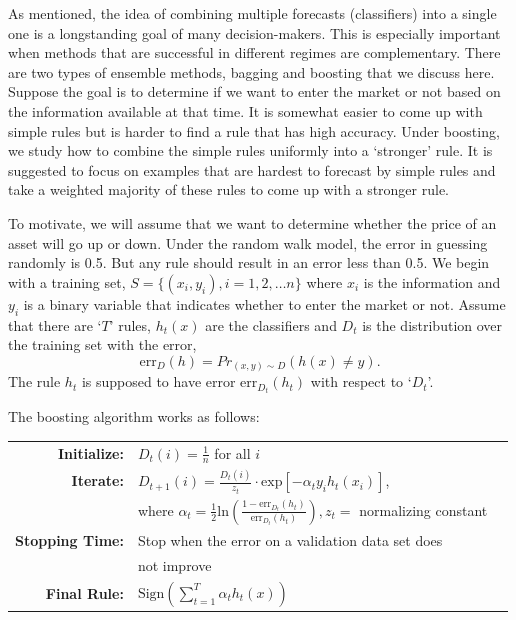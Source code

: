 As mentioned,\label{in:bagging}\label{in:boost1} the idea of combining multiple forecasts (classifiers) into a single one is a longstanding goal of many decision-makers. This is especially important when methods that are successful in different regimes are complementary. There are two types of ensemble methods, bagging and boosting that we discuss here. Suppose the goal is to determine if we want to enter the market or not based on the information available at that time. It is somewhat easier to come up with simple rules but is harder to find a rule that has high accuracy. Under boosting, we study how to combine the simple rules uniformly into a `stronger' rule. It is suggested to focus on examples that are hardest to forecast by simple rules and take a weighted majority of these rules to come up with a stronger rule.


To motivate, we will assume that we want to determine whether the price of an asset will go up or down. Under the random walk model, the error in guessing randomly is 0.5. But any rule should result in an error less than 0.5. We begin with a training set, $S=\{ (x_i,y_i), i=1,2, \ldots n\}$ where $x_i$ is the information and $y_i$ is a binary variable that indicates whether to enter the market or not. Assume that there are `$T$' rules, $h_t(x)$ are the classifiers and $D_t$ is the distribution over the training set with the error,
	\begin{equation} \label{eq:errdh}
	\text{err}_D(h)=Pr_{(x,y) \sim D}(h(x) \neq y).
	\end{equation}
The rule $h_t$ is supposed to have error $\text{err}_{D_t}(h_t)$ with respect to `$D_t$'. \twomedskip


\noindent The boosting algorithm works as follows:

        \begin{table}[!ht]
        \begin{tabular}{r l r}
        \textbf{Initialize:} & $D_t(i)=\frac{1}{n}$ for all $i$  \\
        \textbf{Iterate:} & $D_{t+1}(i)=\frac{D_t(i)}{z_t} \cdot \text{exp}[-\alpha_t y_i h_t(x_i)]$, \\
        & where $\alpha_t=\frac{1}{2}\text{ln} \left( \frac{1-\text{err}_{D_t}(h_t)}{\text{err}_{D_t}(h_t)} \right), z_t=$ normalizing constant \\
        \textbf{Stopping Time:} & Stop when the error on a validation data set does \\
        & not improve \\
        \textbf{Final Rule:} & $\text{Sign}\left(\sum_{t=1}^T \alpha_t h_t(x)\right)$  \\
        \end{tabular}
        \end{table}
 
